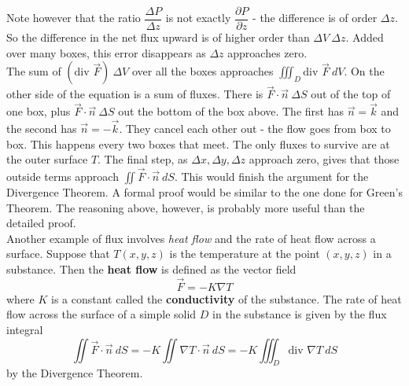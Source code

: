 Note however that the ratio $\dfrac{\Delta P}{\Delta z}$ is not exactly $\dfrac{\partial P}{\partial z}$ - the difference is of order $\Delta z$.  So the difference in the net flux upward is of higher order than $\Delta V \: \Delta z$.  Added over many boxes, this error disappears as $\Delta z$ approaches zero.\\

The sum of $\left( \text{div } \vec F \right) \: \Delta V$ over all the boxes approaches $\iiint_D \text{div } \vec F \: dV$.  On the other side of the equation is a sum of fluxes.  There is $\vec F \cdot \vec n \: \Delta S$ out of the top of one box, plus $\vec F \cdot \vec n \: \Delta S$ out the bottom of the box above.  The first has $\vec n = \vec k$ and the second has $\vec n = -\vec k$.  They cancel each other out - the flow goes from box to box.  This happens every two boxes that meet.  The only fluxes to survive are at the outer surface $T$.  The final step, as $\Delta x, \Delta y, \Delta z$ approach zero, gives that those outside terms approach $\iint \vec F \cdot \vec n \: dS$. This would finish the argument for the Divergence Theorem.  A formal proof would be similar to the one done for Green's Theorem.  The reasoning above, however, is probably more useful than the detailed proof.\\

Another example of flux involves \emph{heat flow} and the rate of heat flow across a surface.  Suppose that $T(x,y,z)$ is the temperature at the point $(x,y,z)$ in a substance. Then the \textbf{heat flow} is defined as the vector field
$$\vec F = -K \nabla T$$
where $K$ is a constant called the \textbf{conductivity} of the substance. The rate of heat flow across the surface of a simple solid $D$ in the substance is given by the flux integral
$$\iint \vec F \cdot \vec n \: dS = -K \iint \nabla T \cdot \vec n \: dS = -K \iiint_D \text{div } \nabla T \: dS$$
by the Divergence Theorem.\\

\\

